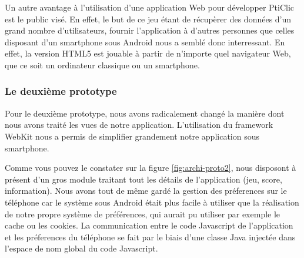 \documentclass[a4paper,11pt,french]{article}
\def\android{Android\texttrademark{}}
\begin{document}
Un autre avantage à l'utilisation d'une application Web pour développer PtiClic est le public visé. En effet, le
but de ce jeu étant de récupèrer des données d'un grand nombre d'utilisateurs, fournir l'application à d'autres personnes que celles
disposant d'un smartphone sous \android{} nous a semblé donc interressant. En effet, la version HTML5 est jouable à partir de n'importe quel navigateur Web, que ce soit un ordinateur classique ou un smartphone.


\subsubsection{Le deuxième prototype}
Pour le deuxième prototype, nous avons radicalement changé la manière dont nous avons traité les vues de notre application. L'utilisation du framework WebKit nous a permis de simplifier grandement notre application sous smartphone.

Comme vous pouvez le constater sur la figure \ref{fig:archi-proto2}, nous disposont à présent d'un gros module traitant tout les détails de l'application (jeu, score, information). Nous avons tout de même gardé la gestion des préferences sur le téléphone car le système sous \android{} était plus facile à utiliser que la réalisation de notre propre système de préférences, qui aurait pu utiliser par exemple le cache ou les cookies. %
La communication entre le code Javascript de l'application et les préferences du téléphone se fait par le biais d'une classe Java injectée dans l'espace de nom global du code Javascript.
\end{document}
